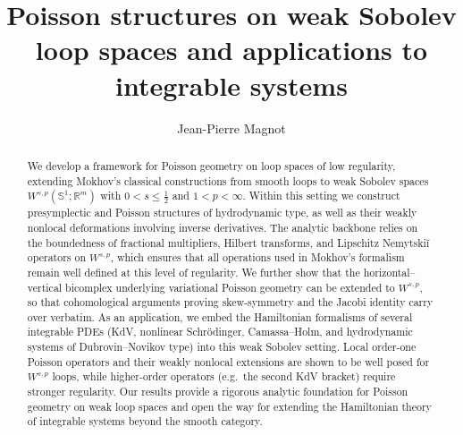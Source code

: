 \documentclass{amsart}
\newcounter{ex}
\newcounter{re}
\begin{document}
\title[$W^{s,p}$ loop spaces]{Poisson structures on weak Sobolev loop spaces and applications to integrable systems}


\author{Jean-Pierre Magnot}

\address{{SFR MATHSTIC, LAREMA, Universit\'e d’Angers, 2 Bd Lavoisier, 
49045 Angers cedex 1, France;  Lyc\'ee Jeanne d'Arc, 40 avenue de Grande Bretagne, 63000 Clermont-Ferrand, 
France}; Lepage Research Institute, 17 novembra 1, 081 16 Presov, Slovakia}



\begin{abstract}
We develop a framework for Poisson geometry on loop spaces of low regularity,
extending Mokhov’s classical constructions from smooth loops to weak Sobolev
spaces $W^{s,p}(\mathbb S^1;\mathbb R^m)$ with $0<s\le \tfrac12$ and $1<p<\infty$.
Within this setting we construct presymplectic and Poisson structures of
hydrodynamic type, as well as their weakly nonlocal deformations involving
inverse derivatives. The analytic backbone relies on the boundedness of
fractional multipliers, Hilbert transforms, and Lipschitz Nemytski{\u i}
operators on $W^{s,p}$, which ensures that all operations used in Mokhov’s
formalism remain well defined at this level of regularity. We further show that
the horizontal--vertical bicomplex underlying variational Poisson geometry can
be extended to $W^{s,p}$, so that cohomological arguments proving skew-symmetry
and the Jacobi identity carry over verbatim. As an application, we embed the
Hamiltonian formalisms of several integrable PDEs (KdV, nonlinear Schrödinger,
Camassa--Holm, and hydrodynamic systems of Dubrovin--Novikov type) into this
weak Sobolev setting. Local order-one Poisson operators and their weakly
nonlocal extensions are shown to be well posed for $W^{s,p}$ loops, while
higher-order operators (e.g.\ the second KdV bracket) require stronger
regularity. Our results provide a rigorous analytic foundation for Poisson
geometry on weak loop spaces and open the way for extending the Hamiltonian
theory of integrable systems beyond the smooth category.
\end{abstract}




\maketitle
\end{document}
